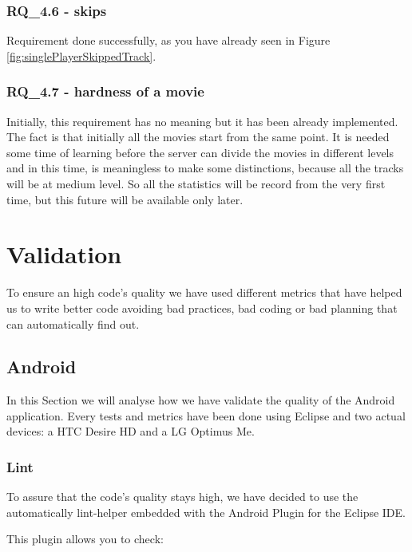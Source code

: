 \subsubsection{RQ\_4.6 - skips}
Requirement done successfully, as you have already seen in Figure \ref{fig:singlePlayerSkippedTrack}.
\subsubsection{RQ\_4.7 - hardness of a movie}
Initially, this requirement has no meaning but it has been already implemented. The fact is that initially all the movies start from the same point. It is needed some time of learning before the server can divide the movies in different levels and in this time, is meaningless to make some distinctions, because all the tracks will be at medium level. So all the statistics will be record from the very first time, but this future will be available only later.

\newpage

\section{Validation}
\label{sec:validation}

To ensure an high code's quality we have used different metrics that have helped us to write better code avoiding bad practices, bad coding or bad planning that can automatically find out.


\subsection{Android}

In this Section we will analyse how we have validate the quality of the Android application. Every tests and metrics have been done using Eclipse and two actual devices: a HTC Desire HD and a LG Optimus Me.

\subsubsection{Lint}
To assure that the code's quality stays high, we have decided to use the automatically lint-helper embedded with the Android Plugin for the Eclipse IDE.

This plugin allows you to check:

